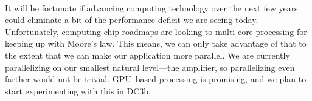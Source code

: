 \paragraph{} It will be fortunate if advancing computing technology
over the next 
few years could eliminate a bit of the performance deficit we are seeing
today.  Unfortunately, computing chip roadmaps are looking to
multi-core processing for keeping up with Moore's law.  This means, we
can only take advantage of that to the extent that we can make our
application more parallel.  We are currently parallelizing on our
smallest natural level---the amplifier, so parallelizing even farther
would not be trivial.  GPU--based processing is promising, and we plan
to start experimenting with this in DC3b. 





